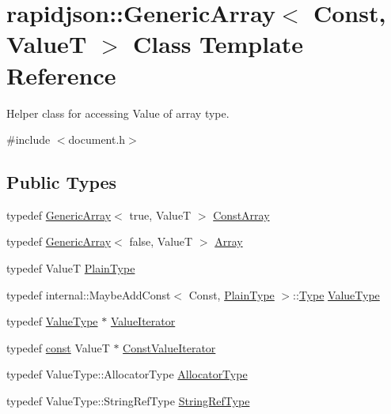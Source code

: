 \hypertarget{classrapidjson_1_1_generic_array}{}\section{rapidjson\+::Generic\+Array$<$ Const, ValueT $>$ Class Template Reference}
\label{classrapidjson_1_1_generic_array}


Helper class for accessing Value of array type.  




{\ttfamily \#include $<$document.\+h$>$}

\subsection*{Public Types}
\begin{DoxyCompactItemize}
\item 
typedef \mbox{\hyperlink{classrapidjson_1_1_generic_array}{Generic\+Array}}$<$ true, ValueT $>$ \mbox{\hyperlink{classrapidjson_1_1_generic_array_a6f2b607cc4e648e5b250dea147843476}{Const\+Array}}
\item 
typedef \mbox{\hyperlink{classrapidjson_1_1_generic_array}{Generic\+Array}}$<$ false, ValueT $>$ \mbox{\hyperlink{classrapidjson_1_1_generic_array_ae82a8e56892743f606ae07da8f9a2f5a}{Array}}
\item 
typedef ValueT \mbox{\hyperlink{classrapidjson_1_1_generic_array_a417eefa7bd2a3d357e947e64044f0bd9}{Plain\+Type}}
\item 
typedef internal\+::\+Maybe\+Add\+Const$<$ Const, \mbox{\hyperlink{classrapidjson_1_1_generic_array_a417eefa7bd2a3d357e947e64044f0bd9}{Plain\+Type}} $>$\+::\mbox{\hyperlink{namespacerapidjson_ae79a4751c1c460ff0de5ecc07874f3e4}{Type}} \mbox{\hyperlink{classrapidjson_1_1_generic_array_aebd828a2f020262b41af908fbb28a571}{Value\+Type}}
\item 
typedef \mbox{\hyperlink{classrapidjson_1_1_generic_array_aebd828a2f020262b41af908fbb28a571}{Value\+Type}} $\ast$ \mbox{\hyperlink{classrapidjson_1_1_generic_array_ae94140e6dbab05cd3918d3e75819dc0a}{Value\+Iterator}}
\item 
typedef \mbox{\hyperlink{classrapidjson_1_1_generic_array_a363f892bf386776e236f5db273f2599f}{const}} ValueT $\ast$ \mbox{\hyperlink{classrapidjson_1_1_generic_array_a0308428814ba3ee5094114e2ccfa2572}{Const\+Value\+Iterator}}
\item 
typedef Value\+Type\+::\+Allocator\+Type \mbox{\hyperlink{classrapidjson_1_1_generic_array_a82298d507b2b15c9d909c25a32f5afeb}{Allocator\+Type}}
\item 
typedef Value\+Type\+::\+String\+Ref\+Type \mbox{\hyperlink{classrapidjson_1_1_generic_array_ad52689025256c94097a0e7bb1c70620e}{String\+Ref\+Type}}
\end{DoxyCompactItemize}
